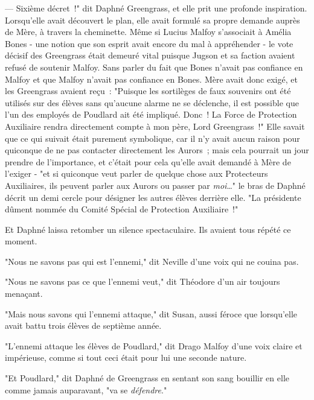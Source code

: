 --- Sixième décret~!" dit Daphné Greengrass, et elle prit une profonde inspiration. Lorsqu'elle avait découvert le plan, elle avait formulé sa propre demande auprès de Mère, à travers la cheminette. Même si Lucius Malfoy s'associait à Amélia Bones - une notion que son esprit avait encore du mal à appréhender - le vote décisif des Greengrass était demeuré vital puisque Jugson et sa faction avaient refusé de soutenir Malfoy. Sans parler du fait que Bones n'avait pas confiance en Malfoy et que Malfoy n'avait pas confiance en Bones. Mère avait donc exigé, et les Greengrass avaient reçu~: "Puisque les sortilèges de faux souvenirs ont été utilisés sur des élèves sans qu'aucune alarme ne se déclenche, il est possible que l'un des employés de Poudlard ait été impliqué. Donc~! La Force de Protection Auxiliaire rendra directement compte à mon père, Lord Greengrass~!" Elle savait que ce qui suivait était purement symbolique, car il n'y avait aucun raison pour quiconque de ne pas contacter directement les Aurors~; mais cela pourrait un jour prendre de l'importance, et c'était pour cela qu'elle avait demandé à Mère de l'exiger - "et si quiconque veut parler de quelque chose aux Protecteurs Auxiliaires, ils peuvent parler aux Aurors ou passer par \emph{moi}…" le bras de Daphné décrit un demi cercle pour désigner les autres élèves derrière elle. "La présidente dûment nommée du Comité Spécial de Protection Auxiliaire~!"

Et Daphné laissa retomber un silence spectaculaire. Ils avaient tous répété ce moment.

"Nous ne savons pas qui est l'ennemi," dit Neville d'une voix qui ne couina pas.

"Nous ne savons pas ce que l'ennemi veut," dit Théodore d'un air toujours menaçant.

"Mais nous savons qui l'ennemi attaque," dit Susan, aussi féroce que lorsqu'elle avait battu trois élèves de septième année.

"L'ennemi attaque les élèves de Poudlard," dit Drago Malfoy d'une voix claire et impérieuse, comme si tout ceci était pour lui une seconde nature.

"Et Poudlard," dit Daphné de Greengrass en sentant son sang bouillir en elle comme jamais auparavant, "va se \emph{défendre}." 

